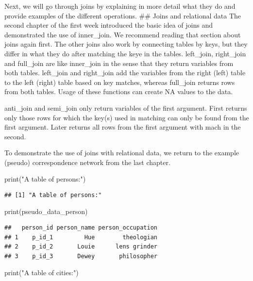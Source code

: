 \documentclass[
]{book}
\newenvironment{Shaded}{\begin{snugshade}}{\end{snugshade}}
\newcommand{\FunctionTok}[1]{\textcolor[rgb]{0.00,0.00,0.00}{#1}}
\newcommand{\NormalTok}[1]{#1}
\newcommand{\StringTok}[1]{\textcolor[rgb]{0.31,0.60,0.02}{#1}}
\begin{document}
Next, we will go through joins by explaining in more detail what they do and provide examples of the different operations.
\#\# Joins and relational data
The second chapter of the first week introduced the basic idea of joins and demonstrated the use of inner\_join. We recommend reading that section about joins again first. The other joins also work by connecting tables by keys, but they differ in what they do after matching the keye in the tables. left\_join, right\_join and full\_join are like inner\_join in the sense that they return variables from both tables. left\_join and right\_join add the variables from the right (left) table to the left (right) table based on key matches, whereas full\_join returns rows from both tables. Usage of these functions can create NA values to the data.

anti\_join and semi\_join only return variables of the first argument. First returns only those rows for which the key(s) used in matching can only be found from the first argument. Later returns all rows from the first argument with mach in the second.

To demonstrate the use of joins with relational data, we return to the example (pseudo) correspondence network from the last chapter.

\begin{Shaded}
\begin{Highlighting}[]
\FunctionTok{print}\NormalTok{(}\StringTok{"A table of persons:"}\NormalTok{)}
\end{Highlighting}
\end{Shaded}

\begin{verbatim}
## [1] "A table of persons:"
\end{verbatim}

\begin{Shaded}
\begin{Highlighting}[]
\FunctionTok{print}\NormalTok{(pseudo\_data\_person)}
\end{Highlighting}
\end{Shaded}

\begin{verbatim}
##   person_id person_name person_occupation
## 1    p_id_1         Hue        theologian
## 2    p_id_2       Louie      lens grinder
## 3    p_id_3       Dewey       philosopher
\end{verbatim}

\begin{Shaded}
\begin{Highlighting}[]
\FunctionTok{print}\NormalTok{(}\StringTok{"A table of cities:"}\NormalTok{)}
\end{Highlighting}
\end{Shaded}
\end{document}
